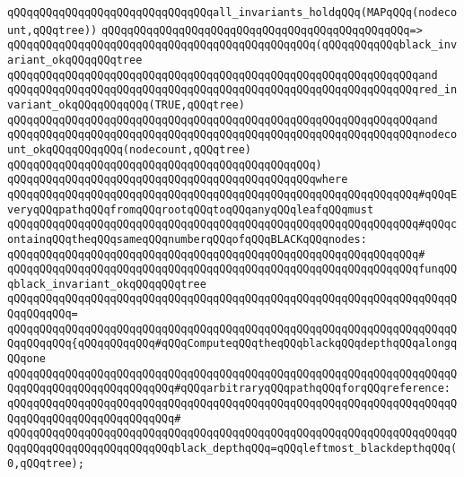 \newline
\verb|qQQqqQQqqQQqqQQqqQQqqQQqqQQqqQQqall_invariants_holdqQQq(MAPqQQq(nodecount,qQQqtree))|\newline
\verb|qQQqqQQqqQQqqQQqqQQqqQQqqQQqqQQqqQQqqQQqqQQqqQQq=>|\newline
\verb|qQQqqQQqqQQqqQQqqQQqqQQqqQQqqQQqqQQqqQQqqQQqqQQq(qQQqqQQqqQQqblack_invariant_okqQQqqQQqtree|\newline
\verb|qQQqqQQqqQQqqQQqqQQqqQQqqQQqqQQqqQQqqQQqqQQqqQQqqQQqqQQqqQQqqQQqand|\newline
\verb|qQQqqQQqqQQqqQQqqQQqqQQqqQQqqQQqqQQqqQQqqQQqqQQqqQQqqQQqqQQqqQQqred_invariant_okqQQqqQQqqQQq(TRUE,qQQqtree)|\newline
\verb|qQQqqQQqqQQqqQQqqQQqqQQqqQQqqQQqqQQqqQQqqQQqqQQqqQQqqQQqqQQqqQQqand|\newline
\verb|qQQqqQQqqQQqqQQqqQQqqQQqqQQqqQQqqQQqqQQqqQQqqQQqqQQqqQQqqQQqqQQqnodecount_okqQQqqQQqqQQq(nodecount,qQQqtree)|\newline
\verb|qQQqqQQqqQQqqQQqqQQqqQQqqQQqqQQqqQQqqQQqqQQqqQQq)|\newline
\verb|qQQqqQQqqQQqqQQqqQQqqQQqqQQqqQQqqQQqqQQqqQQqqQQqwhere|\newline
\verb|qQQqqQQqqQQqqQQqqQQqqQQqqQQqqQQqqQQqqQQqqQQqqQQqqQQqqQQqqQQqqQQq#qQQqEveryqQQqpathqQQqfromqQQqrootqQQqtoqQQqanyqQQqleafqQQqmust|\newline
\verb|qQQqqQQqqQQqqQQqqQQqqQQqqQQqqQQqqQQqqQQqqQQqqQQqqQQqqQQqqQQqqQQq#qQQqcontainqQQqtheqQQqsameqQQqnumberqQQqofqQQqBLACKqQQqnodes:|\newline
\verb|qQQqqQQqqQQqqQQqqQQqqQQqqQQqqQQqqQQqqQQqqQQqqQQqqQQqqQQqqQQqqQQq#|\newline
\verb|qQQqqQQqqQQqqQQqqQQqqQQqqQQqqQQqqQQqqQQqqQQqqQQqqQQqqQQqqQQqqQQqfunqQQqblack_invariant_okqQQqqQQqtree|\newline
\verb|qQQqqQQqqQQqqQQqqQQqqQQqqQQqqQQqqQQqqQQqqQQqqQQqqQQqqQQqqQQqqQQqqQQqqQQqqQQqqQQq=|\newline
\verb|qQQqqQQqqQQqqQQqqQQqqQQqqQQqqQQqqQQqqQQqqQQqqQQqqQQqqQQqqQQqqQQqqQQqqQQqqQQqqQQq{qQQqqQQqqQQq#qQQqComputeqQQqtheqQQqblackqQQqdepthqQQqalongqQQqone|\newline
\verb|qQQqqQQqqQQqqQQqqQQqqQQqqQQqqQQqqQQqqQQqqQQqqQQqqQQqqQQqqQQqqQQqqQQqqQQqqQQqqQQqqQQqqQQqqQQqqQQq#qQQqarbitraryqQQqpathqQQqforqQQqreference:|\newline
\verb|qQQqqQQqqQQqqQQqqQQqqQQqqQQqqQQqqQQqqQQqqQQqqQQqqQQqqQQqqQQqqQQqqQQqqQQqqQQqqQQqqQQqqQQqqQQqqQQq#|\newline
\verb|qQQqqQQqqQQqqQQqqQQqqQQqqQQqqQQqqQQqqQQqqQQqqQQqqQQqqQQqqQQqqQQqqQQqqQQqqQQqqQQqqQQqqQQqqQQqqQQqblack_depthqQQq=qQQqleftmost_blackdepthqQQq(0,qQQqtree);|\newline
